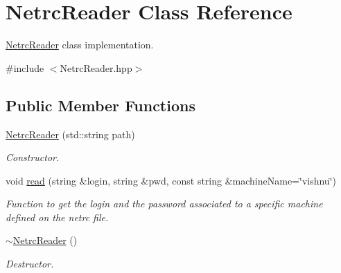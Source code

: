 \hypertarget{classNetrcReader}{
\section{NetrcReader Class Reference}
\label{classNetrcReader}
}


\hyperlink{classNetrcReader}{NetrcReader} class implementation.  




{\ttfamily \#include $<$NetrcReader.hpp$>$}

\subsection*{Public Member Functions}
\begin{DoxyCompactItemize}
\item 
\hyperlink{classNetrcReader_ab9005fa7effec542628d4dfb033f6969}{NetrcReader} (std::string path)
\begin{DoxyCompactList}\small\item\em Constructor. \item\end{DoxyCompactList}\item 
void \hyperlink{classNetrcReader_a24b6cd69a5a43dffca8ffeb335dad65c}{read} (string \&login, string \&pwd, const string \&machineName=\char`\"{}vishnu\char`\"{})
\begin{DoxyCompactList}\small\item\em Function to get the login and the password associated to a specific machine defined on the netrc file. \item\end{DoxyCompactList}\item 
\hypertarget{classNetrcReader_ac5efff041a69f24199e82ca89fce9494}{
\hyperlink{classNetrcReader_ac5efff041a69f24199e82ca89fce9494}{$\sim$NetrcReader} ()}
\label{classNetrcReader_ac5efff041a69f24199e82ca89fce9494}

\begin{DoxyCompactList}\small\item\em Destructor. \item\end{DoxyCompactList}\end{DoxyCompactItemize}
